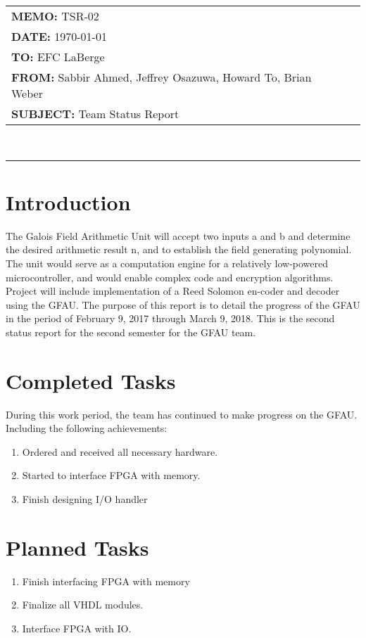 \documentclass[paper=usletter, fontsize=12pt]{article}
\newcommand{\Sabbir}{Sabbir Ahmed}
\newcommand{\Jeffrey}{Jeffrey Osazuwa}
\newcommand{\Howard}{Howard To}
\newcommand{\Brian}{Brian Weber}
\newcommand{\documentinfo}[5]{
    \begin{centering}
        \parbox{6.8in}{
        \begin{spacing}{1}
            \begin{flushleft}
                \begin{tabular}{l l}
                    #1 \\
                    #2 \\
                    #3 \\
                    #4 \\
                    #5 \\
                \end{tabular} \\
                \rule{\textwidth}{1pt}
            \end{flushleft}
        \end{spacing}
        }
    \end{centering}
}
\begin{document}
    \documentinfo{\textbf{MEMO:} TSR-02}{\textbf{DATE: }{\today}}{\textbf{TO: } EFC LaBerge}{\textbf{FROM: }\Sabbir, \Jeffrey, \Howard, \Brian}{\textbf{SUBJECT: } Team Status Report}

    \vspace{-0.3in}
    \section{Introduction}
   The  Galois  Field  Arithmetic  Unit  will  accept  two  inputs  a  and  b  and  determine  the  desired arithmetic result n, and to establish the field generating polynomial.  The unit would serve as a computation engine for a relatively low-powered microcontroller, and would enable complex code and encryption algorithms.  Project will include implementation of a Reed Solomon en-coder and decoder using the GFAU. The purpose of this report is to detail the progress of the GFAU in the period of February 9, 2017 through March 9, 2018. This is the second status report for the second semester for the GFAU team.


    \section{Completed Tasks}
    During this work period, the team has continued to make progress on the GFAU. Including the following achievements:
    \begin{enumerate}

        \item Ordered and received all necessary hardware.
        \item Started to interface FPGA with memory. 
        \item Finish designing I/O handler 
 

    \end{enumerate}


    \section{Planned Tasks}
    \begin{enumerate}

        \item Finish interfacing FPGA with memory 
        \item Finalize all VHDL modules.
        \item Interface FPGA with IO. 

    \end{enumerate}
\end{document}
